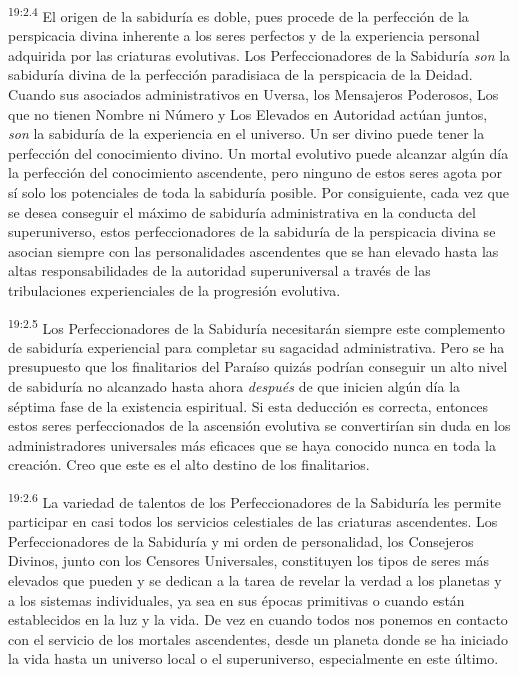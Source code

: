 \par
\textsuperscript{19:2.4} El origen de la sabiduría es doble, pues procede de la perfección de la perspicacia divina inherente a los seres perfectos y de la experiencia personal adquirida por las criaturas evolutivas. Los Perfeccionadores de la Sabiduría \textit{son} la sabiduría divina de la perfección paradisiaca de la perspicacia de la Deidad. Cuando sus asociados administrativos en Uversa, los Mensajeros Poderosos, Los que no tienen Nombre ni Número y Los Elevados en Autoridad actúan juntos, \textit{son} la sabiduría de la experiencia en el universo. Un ser divino puede tener la perfección del conocimiento divino. Un mortal evolutivo puede alcanzar algún día la perfección del conocimiento ascendente, pero ninguno de estos seres agota por sí solo los potenciales de toda la sabiduría posible. Por consiguiente, cada vez que se desea conseguir el máximo de sabiduría administrativa en la conducta del superuniverso, estos perfeccionadores de la sabiduría de la perspicacia divina se asocian siempre con las personalidades ascendentes que se han elevado hasta las altas responsabilidades de la autoridad superuniversal a través de las tribulaciones experienciales de la progresión evolutiva.

\par
\textsuperscript{19:2.5} Los Perfeccionadores de la Sabiduría necesitarán siempre este complemento de sabiduría experiencial para completar su sagacidad administrativa. Pero se ha presupuesto que los finalitarios del Paraíso quizás podrían conseguir un alto nivel de sabiduría no alcanzado hasta ahora \textit{después} de que inicien algún día la séptima fase de la existencia espiritual. Si esta deducción es correcta, entonces estos seres perfeccionados de la ascensión evolutiva se convertirían sin duda en los administradores universales más eficaces que se haya conocido nunca en toda la creación. Creo que este es el alto destino de los finalitarios.

\par
\textsuperscript{19:2.6} La variedad de talentos de los Perfeccionadores de la Sabiduría les permite participar en casi todos los servicios celestiales de las criaturas ascendentes. Los Perfeccionadores de la Sabiduría y mi orden de personalidad, los Consejeros Divinos, junto con los Censores Universales, constituyen los tipos de seres más elevados que pueden y se dedican a la tarea de revelar la verdad a los planetas y a los sistemas individuales, ya sea en sus épocas primitivas o cuando están establecidos en la luz y la vida. De vez en cuando todos nos ponemos en contacto con el servicio de los mortales ascendentes, desde un planeta donde se ha iniciado la vida hasta un universo local o el superuniverso, especialmente en este último.


